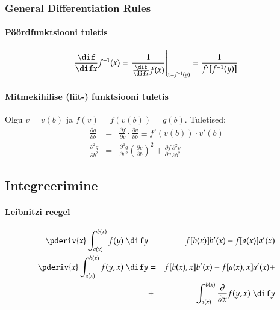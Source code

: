 \documentclass[a4paper]{article}
\numberwithin{equation}{subsection}
\begin{document}
\subsubsection{General Differentiation Rules}

\paragraph{Pöördfunktsiooni tuletis}
\begin{equation}
\frac{\dif}{\dif x} f^{-1}(x) = 
  \left. \frac{1}{\frac{\dif}{\dif x} f(x)} \right|_{x=f^{-1}(y)} =
  \frac{1}{f'[f^{-1}(y)]}
\end{equation}

\paragraph{Mitmekihilise (liit-) funktsiooni tuletis}
Olgu $v=v(b)$ ja $f(v) = f(v(b)) = g(b)$.  Tuletised:
\begin{eqnarray}
  \label{eq:mitmekihilise_tuletis}
  \frac{\partial g}{\partial b} &=& 
  \frac{\partial f}{\partial v} \cdot \frac{\partial v}{\partial b}
  \equiv
  f'(v(b)) \cdot v'(b)\\
  \frac{\partial^2 g}{\partial b^2} &=&
  \frac{\partial^2 g}{\partial v^2} 
  \left(\frac{\partial v}{\partial b} \right)^2 +
  \frac{\partial f}{\partial v}\frac{\partial^2 v}{\partial b^2}
\end{eqnarray}




\subsection{Integreerimine}

\paragraph{Leibnitzi reegel}
\begin{eqnarray}
  \pderiv{x}
  \int_{a(x)}^{b(x)} f(y) \;\dif y
  & = &
  f[b(x)] b'(x) - f[a(x)]a'(x)\\
%
  \pderiv{x}
  \int_{a(x)}^{b(x)} f(y,x) \;\dif y 
  & = &
  f[b(x),x] b'(x) - f[a(x),x]a'(x) + \notag\\
  & + & 
  \int_{a(x)}^{b(x)} \frac{\partial}{\partial x} f(y,x) \;\dif y
\end{eqnarray}
\end{document}
